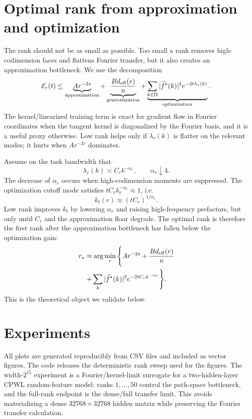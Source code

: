 \documentclass[10pt,twocolumn]{article}
\newcommand{\1}{\mathbf{1}}
\newcommand{\cE}{\mathcal{E}}
\newcommand{\wh}{\widehat}
\begin{document}
\section{Optimal rank from approximation and optimization}
The rank should not be as small as possible.  Too small a rank removes high-codimension faces and flattens Fourier transfer, but it also creates an approximation bottleneck.  We use the decomposition
\begin{equation}\label{eq:totalrisk}
\cE_r(t)\le
\underbrace{A r^{-2s}}_{\rm approximation}
+\underbrace{\frac{B d_{\rm eff}(r)}{n}}_{\rm generalization}
+\underbrace{\sum_{k\in\Omega}|\wh f^\star(k)|^2 e^{-2t\lambda_r(k)}}_{\rm optimization}.
\end{equation}
The kernel/linearized training term is exact for gradient flow in Fourier coordinates when the tangent kernel is diagonalized by the Fourier basis, and it is a useful proxy otherwise.  Low rank helps only if $\lambda_r(k)$ is flatter on the relevant modes; it hurts when $A r^{-2s}$ dominates.

Assume on the task bandwidth that
\begin{equation}\label{eq:lambdar}
\lambda_r(k)\asymp C_r k^{-\alpha_r},\qquad
\alpha_r\downarrow 4.
\end{equation}
The decrease of $\alpha_r$ occurs when high-codimension moments are suppressed.  The optimization cutoff mode satisfies $t C_r k_t^{-\alpha_r}\approx1$, i.e.
\begin{equation}\label{eq:cutoff}
k_t(r)\approx (t C_r)^{1/\alpha_r}.
\end{equation}
Low rank improves $k_t$ by lowering $\alpha_r$ and raising high-frequency prefactors, but only until $C_r$ and the approximation floor degrade.  The optimal rank is therefore the first rank after the approximation bottleneck has fallen below the optimization gain:
\begin{multline}\label{eq:optcondition}
r_\star\approx\arg\min_r
\Bigg\{ A r^{-2s}+\frac{B d_{\rm eff}(r)}{n}\\
+\sum_k |\wh f^\star(k)|^2e^{-2t C_r k^{-\alpha_r}}\Bigg\}.
\end{multline}
This is the theoretical object we validate below.

\section{Experiments}
All plots are generated reproducibly from CSV files and included as vector figures.  The code releases the deterministic rank sweep used for the figures.  The width-$2^{15}$ experiment is a Fourier/kernel-limit surrogate for a two-hidden-layer CPWL random-feature model: ranks $1,\ldots,50$ control the path-space bottleneck, and the full-rank endpoint is the dense/full transfer limit.  This avoids materializing a dense $32768\times32768$ hidden matrix while preserving the Fourier transfer calculation.
\end{document}
